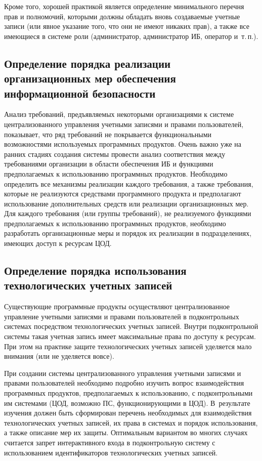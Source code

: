 \begin{multicols}{2}
       Кроме того, хорошей практикой является определение минимального перечня 
прав и полномочий, которыми должны обладать вновь со\-зда\-ва\-емые учетные записи (или 
явное указание того, что они не имеют никаких прав), а также все имеющиеся в сис\-те\-ме 
роли (администратор, администратор ИБ, оператор и~т.\,п.).

\subsection{Определение порядка реализации организационных мер 
обеспечения информационной безопасности}
       
       Анализ требований, предъявляемых некоторыми организациями к сис\-те\-ме 
централизованного управления учетными записями и правами пользователей, показывает, 
что ряд требований не покрывается функциональными возможностями используемых 
программных продуктов. Очень важно уже на ранних стадиях создания сис\-те\-мы провести 
анализ соответствия между требованиями организации
в области обеспечения ИБ и 
функциями предполагаемых к использованию программных продуктов.\linebreak 
Необходимо  определить все механизмы реализации каждого требования, а также 
требования, ко\-торые  не реализуются средствами программного\linebreak
продукта и  предполагают использование 
дополнительных средств или реализации организационных мер. Для каждого требования 
(или группы требований), не реализуемого функциями предполагаемых к использованию 
программных продуктов, необходимо разработать организационные меры и порядок их 
реализации в подразделениях, имеющих доступ к ресурсам ЦОД. 

\subsection{Определение порядка использования технологических учетных записей}

       Существующие программные продукты осуществляют централизованное 
управление учетными записями и правами пользователей в подконтрольных сис\-те\-мах 
посредством технологических учетных записей. Внутри подконтрольной сис\-те\-мы такая 
учетная запись имеет максимальные права по доступу к ресурсам. При этом на практике 
защите технологических учетных записей уделяется мало внимания (или не уделяется 
вовсе).
       
       При создании сис\-те\-мы централизованного управления учетными записями и 
правами пользователей необходимо подробно изучить вопрос взаимодействия 
программных продуктов, предполагаемых к использованию, с подконтрольными им 
сис\-те\-ма\-ми (ЦОД, возможно ПС, функционирующими в ЦОД). В~результате изучения 
должен быть сформирован перечень необходимых для взаимодействия технологических 
учетных записей, их права в сис\-те\-мах и порядок использования, а также описание мер их 
защиты. Оптимальным вариантом во многих случаях считается запрет интерактивного 
входа в подконтрольную сис\-те\-му с использованием идентификаторов технологических 
учетных записей.


\end{multicols}
